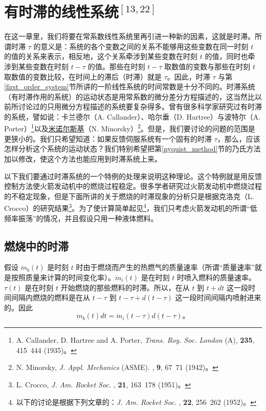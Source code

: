 
\chapter{有时滞的线性系统$^{[13,22]}$}

在这一章里，我们将要在常系数线性系统里再引进一种新的因素，这就是时滞。所谓时滞 $\tau$ 的意义是：系统的各个变数之间的关系不能够用这些变数在同一时刻 $t$ 的值的关系来表示，相反地，这个关系牵涉到某些变数在时刻 $t$ 的值，同时也牵涉到某些变数在时刻 $t-\tau$ 的值。那些在时刻 $t-\tau$ 取数值的变数与那些在时刻 $t$ 取数值的变数比较，在时间上的滞后（时滞）就是 $\tau$。因此，时滞 $\tau$ 与第\ref{first_order_system}节所讲的一阶线性系统的时间常数是十分不同的。时滞系统（有时滞作用的系统）的运动状态是用常系数的微分差分方程描述的，这当然比以前所讨论过的只用微分方程描述的系统要复杂得多。曾有很多科学家研究过有时滞的系统，譬如说：卡兰德尔（A. Callander）、哈尔垂（D. Hartree）与波特尔（A. Porter）\footnote{A. Callander, D. Hartree and A. Porter, \textit{Trans. Roy. Soc. London} (A), \textbf{235}, 415~444 (1935)。}以及\underline{米诺尔斯基}（N. Minorsky）\footnote{N. Minorsky, \textit{J. Appl. Mechanics} (ASME). , \textbf{9}, 67~71 (1942)。}。但是，我们要讨论的问题的范围是更狭小的。我们只希望知道：如果反馈伺服系统有一个固有的时滞 $\tau$，那么，应该怎样分析这个系统的运动状态？我们特别希望把第\ref{nyquist_method}节的乃氏方法加以修改，使这个方法也能应用到时滞系统上来。

以下我们要通过时滞系统的一个特例的处理来说明这种理论。这个特例就是用反馈控制方法使火箭发动机中的燃烧过程稳定。很多学者研究过火箭发动机中燃烧过程的不稳定现象，但是下面所讲的关于燃烧的时滞现象的分析只是根据克洛克（L. Crocco）的研究结果\footnote{L. Crocco, \textit{J. Am. Rocket Soc.} , \textbf{21}, 163~178 (1951)。}。为了使计算简单起见\footnote{以下的讨论是根据下列文章的：\textit{J. Am. Rocket Soc.} , \textbf{22}, 256~262 (1952)。}，我们只考虑火箭发动机的所谓“低频率振荡”的情况，并且假设只用一种液体燃料。


\section{燃烧中的时滞}

假设 $ \dot{m}_b(t) $ 是时刻 $ t $ 时由于燃烧而产生的热燃气的质量速率（所谓“质量速率”就是按照质量来计算的时间变化率）。$ \dot{m}_i(t) $ 是在时刻 $ t $ 时喷入燃料的质量速率。$ \tau(t) $ 是在时刻 $ t $ 开始燃烧的那些燃料的时滞。所以，在从 $ t $ 到 $ t + dt $ 这一段时间间隔内燃烧的燃料是在从 $ t - \tau $ 到 $ t - \tau + d(t - \tau) $ 这一段时间间隔内喷射进来的。因此
\begin{equation}\label{eq:ch8_mass_balance}
\dot{m}_b(t)dt = \dot{m}_i(t - \tau)d(t - \tau)。
\end{equation}

